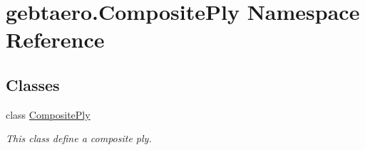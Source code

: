\hypertarget{namespacegebtaero_1_1_composite_ply}{}\section{gebtaero.\+Composite\+Ply Namespace Reference}
\label{namespacegebtaero_1_1_composite_ply}
\subsection*{Classes}
\begin{DoxyCompactItemize}
\item 
class \hyperlink{classgebtaero_1_1_composite_ply_1_1_composite_ply}{Composite\+Ply}
\begin{DoxyCompactList}\small\item\em This class define a composite ply. \end{DoxyCompactList}\end{DoxyCompactItemize}
